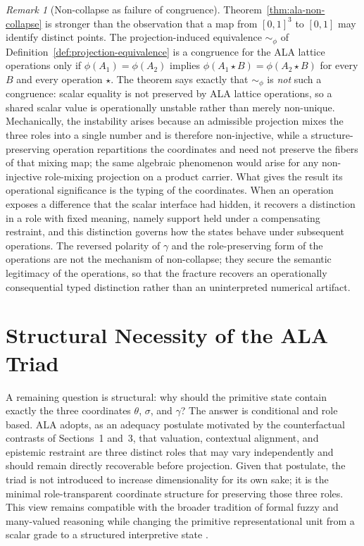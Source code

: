 \documentclass[reqno,final]{amsart}
\theoremstyle{definition}
\theoremstyle{plain}
\theoremstyle{remark}
\newtheorem{remark}{Remark}
\begin{document}
\begin{remark}[Non-collapse as failure of congruence]
\label{rem:congruence}
Theorem~\ref{thm:ala-non-collapse} is stronger than the observation that a map from \([0,1]^3\) to \([0,1]\) may identify distinct points. The projection-induced equivalence \(\sim_\phi\) of Definition~\ref{def:projection-equivalence} is a congruence for the ALA lattice operations only if \(\phi(A_1)=\phi(A_2)\) implies \(\phi(A_1\star B)=\phi(A_2\star B)\) for every \(B\) and every operation \(\star\). The theorem says exactly that \(\sim_\phi\) is \emph{not} such a congruence: scalar equality is not preserved by ALA lattice operations, so a shared scalar value is operationally unstable rather than merely non-unique. Mechanically, the instability arises because an admissible projection mixes the three roles into a single number and is therefore non-injective, while a structure-preserving operation repartitions the coordinates and need not preserve the fibers of that mixing map; the same algebraic phenomenon would arise for any non-injective role-mixing projection on a product carrier. What gives the result its operational significance is the typing of the coordinates. When an operation exposes a difference that the scalar interface had hidden, it recovers a distinction in a role with fixed meaning, namely support held under a compensating restraint, and this distinction governs how the states behave under subsequent operations. The reversed polarity of \(\gamma\) and the role-preserving form of the operations are not the mechanism of non-collapse; they secure the semantic legitimacy of the operations, so that the fracture recovers an operationally consequential typed distinction rather than an uninterpreted numerical artifact.
\end{remark}

\section{Structural Necessity of the ALA Triad}
\label{sec:structural-necessity}

A remaining question is structural: why should the primitive state contain exactly the three coordinates
\(\theta\), \(\sigma\), and \(\gamma\)? The answer is conditional and role based. ALA adopts, as an adequacy postulate motivated by the counterfactual contrasts of Sections~1 and~3, that valuation, contextual alignment, and epistemic restraint are three distinct roles that may vary independently and should remain directly recoverable before projection. Given that postulate, the triad is not introduced to increase dimensionality for its own sake; it is the minimal role-transparent coordinate structure for preserving those three roles. This view remains compatible with the broader tradition of formal fuzzy and many-valued reasoning while changing the primitive representational unit from a scalar grade to a structured interpretive state \cite{Hajek1998}.
\end{document}
